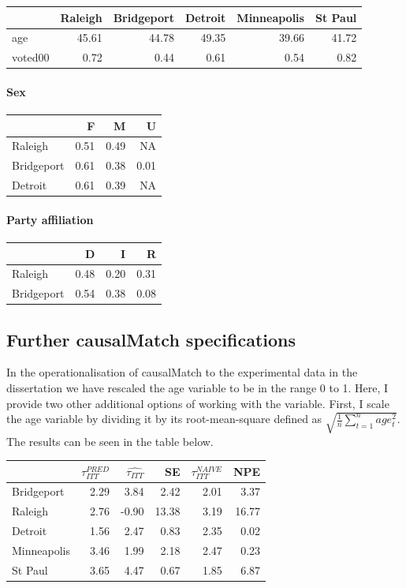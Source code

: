 \documentclass[]{article}
\let\oldparagraph\paragraph
\renewcommand{\paragraph}[1]{\oldparagraph{#1}\mbox{}}
\begin{document}
\begin{longtable}[]{@{}lrrrrr@{}}
\toprule
& Raleigh & Bridgeport & Detroit & Minneapolis & St Paul\tabularnewline
\midrule
\endhead
age & 45.61 & 44.78 & 49.35 & 39.66 & 41.72\tabularnewline
voted00 & 0.72 & 0.44 & 0.61 & 0.54 & 0.82\tabularnewline
\bottomrule
\end{longtable}

\paragraph{Sex}\label{sex}

\begin{longtable}[]{@{}lrrr@{}}
\toprule
& F & M & U\tabularnewline
\midrule
\endhead
Raleigh & 0.51 & 0.49 & NA\tabularnewline
Bridgeport & 0.61 & 0.38 & 0.01\tabularnewline
Detroit & 0.61 & 0.39 & NA\tabularnewline
\bottomrule
\end{longtable}

\paragraph{Party affiliation}\label{party-affiliation}

\begin{longtable}[]{@{}lrrr@{}}
\toprule
& D & I & R\tabularnewline
\midrule
\endhead
Raleigh & 0.48 & 0.20 & 0.31\tabularnewline
Bridgeport & 0.54 & 0.38 & 0.08\tabularnewline
\bottomrule
\end{longtable}

\subsection{Further causalMatch
specifications}\label{further-causalmatch-specifications}

In the operationalisation of causalMatch to the experimental data in the
dissertation we have rescaled the age variable to be in the range 0 to
1. Here, I provide two other additional options of working with the
variable. First, I scale the age variable by dividing it by its
root-mean-square defined as \(\sqrt{\frac{1}{n}\sum_{t=1}^{n}age_t^2}\).
The results can be seen in the table below.

\begin{longtable}[]{@{}lrrrrr@{}}
\toprule
& \(\tau_{ITT}^{PRED}\) & \(\hat{\tau_{ITT}}\) & SE &
\(\tau_{ITT}^{NAIVE}\) & NPE\tabularnewline
\midrule
\endhead
Bridgeport & 2.29 & 3.84 & 2.42 & 2.01 & 3.37\tabularnewline
Raleigh & 2.76 & -0.90 & 13.38 & 3.19 & 16.77\tabularnewline
Detroit & 1.56 & 2.47 & 0.83 & 2.35 & 0.02\tabularnewline
Minneapolis & 3.46 & 1.99 & 2.18 & 2.47 & 0.23\tabularnewline
St Paul & 3.65 & 4.47 & 0.67 & 1.85 & 6.87\tabularnewline
\bottomrule
\end{longtable}
\end{document}
